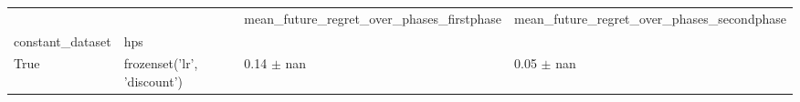 \begin{tabular}{llll}
\toprule
 &  & mean_future_regret_over_phases_firstphase & mean_future_regret_over_phases_secondphase \\
constant_dataset & hps &  &  \\
\midrule
True & frozenset({'lr', 'discount'}) & 0.14 $\pm$ nan & 0.05 $\pm$ nan \\
\cline{1-4}
\bottomrule
\end{tabular}
